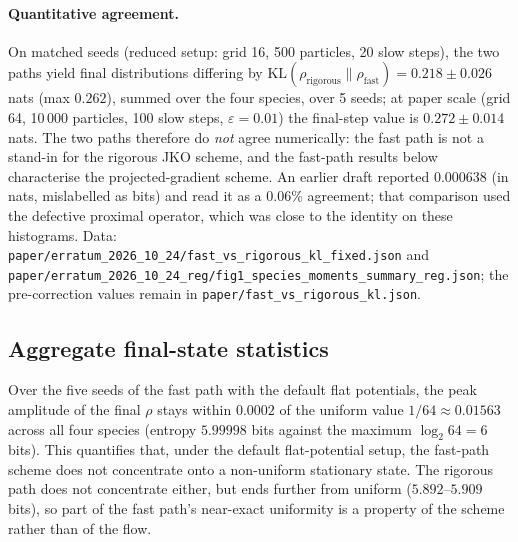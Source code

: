 \documentclass[11pt]{article}
\begin{document}
\paragraph{Quantitative agreement.} On matched seeds
(reduced setup: grid 16, 500 particles, 20 slow steps), the two paths
yield final distributions differing by
$\mathrm{KL}(\rho_{\text{rigorous}} \| \rho_{\text{fast}}) =
0.218 \pm 0.026$ nats (max $0.262$), summed over the four species,
over 5 seeds; at paper scale (grid 64, 10\,000 particles, 100 slow
steps, $\varepsilon = 0.01$) the final-step value is $0.272 \pm 0.014$
nats. The two paths
therefore do \emph{not} agree numerically: the fast path is not a
stand-in for the rigorous JKO scheme, and the fast-path results below
characterise the projected-gradient scheme. An earlier draft reported
$0.000638$ (in nats, mislabelled as bits) and read it as a $0.06\%$
agreement; that comparison used the defective proximal operator, which
was close to the identity on these histograms. Data:
\texttt{paper/erratum\_2026\_10\_24/fast\_vs\_rigorous\_kl\_fixed.json}
and \texttt{paper/erratum\_2026\_10\_24\_reg/fig1\_species\_moments\_summary\_reg.json};
the pre-correction
values remain in \texttt{paper/fast\_vs\_rigorous\_kl.json}.

\subsection{Aggregate final-state statistics}
\label{sec:aggregate}
Over the five seeds of the fast path with the default flat
potentials, the peak amplitude of the final $\rho$ stays within
$0.0002$ of the uniform value $1/64 \approx 0.01563$ across all four
species (entropy $5.99998$ bits against the maximum $\log_2 64 = 6$
bits). This quantifies that, under the default flat-potential setup,
the fast-path scheme does not concentrate onto a non-uniform
stationary state. The rigorous path does not concentrate either, but
ends further from uniform ($5.892$--$5.909$ bits), so part of the
fast path's near-exact uniformity is a property of the scheme rather
than of the flow.
\end{document}
